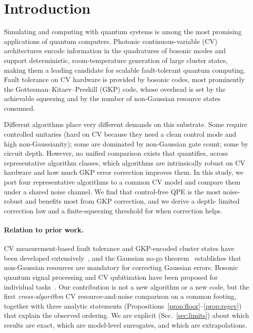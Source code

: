 \documentclass[aps,prxquantum,reprint,superscriptaddress,nofootinbib]{revtex4-2}
\begin{document}
\section{Introduction}
Simulating and computing with quantum systems is among the most promising
applications of quantum computers. Photonic continuous-variable (CV)
architectures encode information in the quadratures of bosonic modes and
support deterministic, room-temperature generation of large cluster states,
making them a leading candidate for scalable fault-tolerant quantum
computing. Fault tolerance on CV hardware is provided by bosonic codes, most
prominently the Gottesman--Kitaev--Preskill (GKP) code, whose overhead is set
by the achievable squeezing and by the number of non-Gaussian resource states
consumed.

Different algorithms place very different demands on this substrate. Some
require controlled unitaries (hard on CV because they need a clean control
mode and high non-Gaussianity); some are dominated by non-Gaussian gate count;
some by circuit depth. However, no unified comparison exists that quantifies,
across representative algorithm classes, which algorithms are intrinsically
robust on CV hardware and how much GKP error correction improves them. In this
study, we port four representative algorithms to a common CV model and compare
them under a shared noise channel. We find that control-free QPE is the most
noise-robust and benefits most from GKP correction, and we derive a depth-
limited correction law and a finite-squeezing threshold for when correction
helps.

\paragraph{Relation to prior work.}
CV measurement-based fault tolerance and GKP-encoded cluster states have been
developed extensively~\cite{Menicucci2014,Bourassa2021,Fukui2018}, and the
Gaussian no-go theorem~\cite{Niset2009} establishes that non-Gaussian
resources are mandatory for correcting Gaussian errors. Bosonic quantum signal
processing and CV qubitization have been proposed for individual
tasks~\cite{Rossi2022}. Our contribution is not a new algorithm or a new code,
but the first \emph{cross-algorithm} CV resource-and-noise comparison on a
common footing, together with three analytic statements
(Propositions~\ref{prop:floor}--\ref{prop:regev}) that explain the observed
ordering. We are explicit (Sec.~\ref{sec:limits}) about which results are
exact, which are model-level surrogates, and which are extrapolations.
\end{document}
